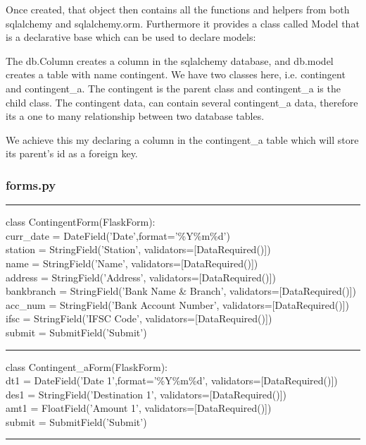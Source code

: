 \documentclass[journal,12pt,twocolumn]{IEEEtran}
\begin{document}
Once created, that object then contains all the functions and helpers from both sqlalchemy and sqlalchemy.orm. Furthermore it provides a class called Model that is a declarative base which can be used to declare models:\par

The db.Column creates a column in the sqlalchemy database, and db.model creates a table with name contingent. We have two classes here, i.e. contingent and contingent\_a. The contingent is the parent class and contingent\_a is the child class. The contingent data, can contain several contingent\_a data, therefore its a one to many relationship between two database tables.\par

We achieve this my declaring a column in the contingent\_a table which will store its parent's id as a foreign key. \par

\subsubsection{\textbf{forms.py}}
\begin{flushleft}
\hrule
class ContingentForm(FlaskForm): \\
\qquad    curr\_date = DateField('Date',format='\%Y\-\%m\-\%d') \\
\qquad    station = StringField('Station', validators=[DataRequired()]) \\
\qquad    name = StringField('Name', validators=[DataRequired()]) \\
\qquad    address = StringField('Address', validators=[DataRequired()]) \\
\qquad    bankbranch = StringField('Bank Name \& Branch',  validators=[DataRequired()])\\
\qquad    acc\_num = StringField('Bank Account Number', validators=[DataRequired()])\\
\qquad    ifsc = StringField('IFSC Code', validators=[DataRequired()])\\
\qquad    submit = SubmitField('Submit')\\

\hrule

class Contingent\_aForm(FlaskForm):\\
\qquad dt1 = DateField('Date 1',format='\%Y\-\%m\-\%d', validators=[DataRequired()])\\
    \qquad des1 = StringField('Destination 1', validators=[DataRequired()])\\
    \qquad amt1 = FloatField('Amount 1', validators=[DataRequired()])\\
    \qquad submit = SubmitField('Submit')\\
\hrule

\end{flushleft}
\end{document}
